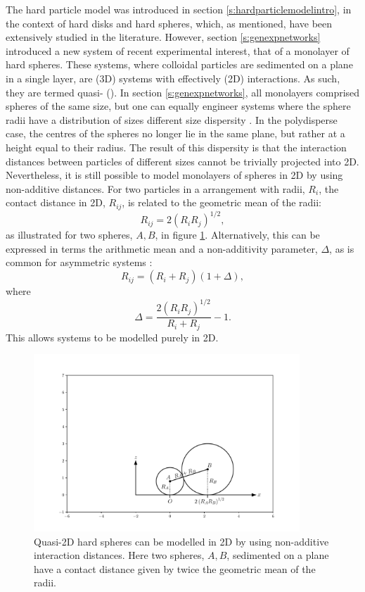 The hard particle model was introduced in section  \ref{s:hardparticlemodelintro}, in the context of hard disks and hard spheres, which, as mentioned, have been extensively studied in the literature.
However, section \ref{s:genexpnetworks} introduced a new system of recent experimental interest, that of a monolayer of hard spheres.
These systems, where colloidal particles are sedimented on a plane in a single layer, are \thd{} (3D) systems with effectively \td{} (2D) interactions.
As such, they are termed quasi\--\td{} (\qtd{}).
In section \ref{s:genexpnetworks}, all monolayers comprised spheres of the same size, but one can equally engineer systems where the sphere radii have a distribution of sizes \ie{} different size dispersity \cite{Thorneywork2014,Thorneywork2018}.
In the polydisperse case, the centres of the spheres no longer lie in the same plane, but rather at a height equal to their radius.
The result of this dispersity is that the interaction distances between particles of different sizes cannot be trivially projected into 2D.
Nevertheless, it is still possible to model monolayers of spheres in 2D by using non\--additive distances.
For two particles in a \qtd{} arrangement with radii, $R_i$, the contact distance in 2D, $R_{ij}$, is related to the geometric mean of the radii:
\begin{equation}
	R_{ij}=2\left(R_iR_j\right)^{1/2},
\end{equation}
as  illustrated for two spheres, $A,B$, in figure \ref{fig:nonadddemo}.
Alternatively, this can be expressed in terms the arithmetic mean and a non\--additivity parameter, $\Delta$, as is common for asymmetric systems \cite{Roth2001}:
\begin{equation}
	R_{ij}=\left(R_i+R_j\right)\left(1+\Delta\right),
\end{equation}
where
\begin{equation}
	\Delta=\frac{2\left(R_iR_j\right)^{1/2}}{R_i+R_j}-1.
\end{equation}
This allows \qtd{} systems to be modelled purely in 2D.

\begin{figure}[bth]
     \centering
     
     \includegraphics[width=10cm]{./figures/quasi2d/quasi2d_a.pdf}
     \caption{Quasi\--2D hard spheres can be modelled in 2D by using non\--additive interaction distances. Here two spheres, $A,B$, sedimented on a plane have a contact distance given by twice the geometric mean of the radii.}
     \label{fig:nonadddemo}
\end{figure}


